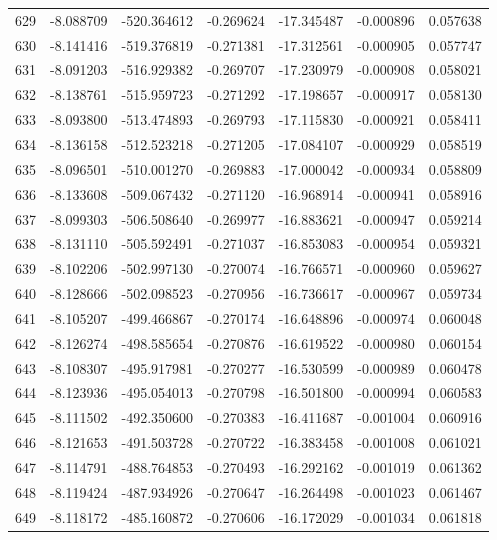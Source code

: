 \begin{tabular}{rrrrrrr}
 629 &  -8.088709 & -520.364612 & -0.269624 &  -17.345487 &   -0.000896 &  0.057638 \\
 630 &  -8.141416 & -519.376819 & -0.271381 &  -17.312561 &   -0.000905 &  0.057747 \\
 631 &  -8.091203 & -516.929382 & -0.269707 &  -17.230979 &   -0.000908 &  0.058021 \\
 632 &  -8.138761 & -515.959723 & -0.271292 &  -17.198657 &   -0.000917 &  0.058130 \\
 633 &  -8.093800 & -513.474893 & -0.269793 &  -17.115830 &   -0.000921 &  0.058411 \\
 634 &  -8.136158 & -512.523218 & -0.271205 &  -17.084107 &   -0.000929 &  0.058519 \\
 635 &  -8.096501 & -510.001270 & -0.269883 &  -17.000042 &   -0.000934 &  0.058809 \\
 636 &  -8.133608 & -509.067432 & -0.271120 &  -16.968914 &   -0.000941 &  0.058916 \\
 637 &  -8.099303 & -506.508640 & -0.269977 &  -16.883621 &   -0.000947 &  0.059214 \\
 638 &  -8.131110 & -505.592491 & -0.271037 &  -16.853083 &   -0.000954 &  0.059321 \\
 639 &  -8.102206 & -502.997130 & -0.270074 &  -16.766571 &   -0.000960 &  0.059627 \\
 640 &  -8.128666 & -502.098523 & -0.270956 &  -16.736617 &   -0.000967 &  0.059734 \\
 641 &  -8.105207 & -499.466867 & -0.270174 &  -16.648896 &   -0.000974 &  0.060048 \\
 642 &  -8.126274 & -498.585654 & -0.270876 &  -16.619522 &   -0.000980 &  0.060154 \\
 643 &  -8.108307 & -495.917981 & -0.270277 &  -16.530599 &   -0.000989 &  0.060478 \\
 644 &  -8.123936 & -495.054013 & -0.270798 &  -16.501800 &   -0.000994 &  0.060583 \\
 645 &  -8.111502 & -492.350600 & -0.270383 &  -16.411687 &   -0.001004 &  0.060916 \\
 646 &  -8.121653 & -491.503728 & -0.270722 &  -16.383458 &   -0.001008 &  0.061021 \\
 647 &  -8.114791 & -488.764853 & -0.270493 &  -16.292162 &   -0.001019 &  0.061362 \\
 648 &  -8.119424 & -487.934926 & -0.270647 &  -16.264498 &   -0.001023 &  0.061467 \\
 649 &  -8.118172 & -485.160872 & -0.270606 &  -16.172029 &   -0.001034 &  0.061818 \\

\end{tabular}
